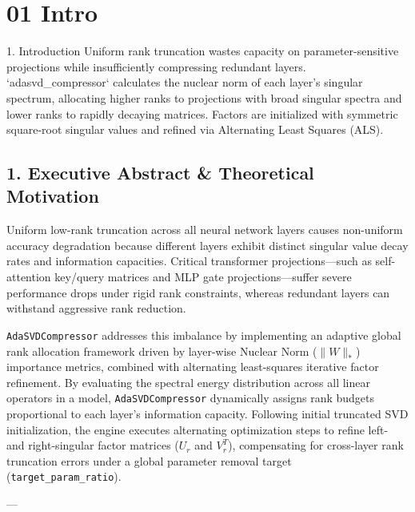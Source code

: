 \section{01 Intro}

 1. Introduction
Uniform rank truncation wastes capacity on parameter-sensitive projections while insufficiently compressing redundant layers. `adasvd\_compressor` calculates the nuclear norm of each layer's singular spectrum, allocating higher ranks to projections with broad singular spectra and lower ranks to rapidly decaying matrices. Factors are initialized with symmetric square-root singular values and refined via Alternating Least Squares (ALS).



\subsection{1. Executive Abstract \& Theoretical Motivation}
Uniform low-rank truncation across all neural network layers causes non-uniform accuracy degradation because different layers exhibit distinct singular value decay rates and information capacities. Critical transformer projections---such as self-attention key/query matrices and MLP gate projections---suffer severe performance drops under rigid rank constraints, whereas redundant layers can withstand aggressive rank reduction.

\texttt{AdaSVDCompressor} addresses this imbalance by implementing an adaptive global rank allocation framework driven by layer-wise Nuclear Norm ($\|W\|_*$) importance metrics, combined with alternating least-squares iterative factor refinement. By evaluating the spectral energy distribution across all linear operators in a model, \texttt{AdaSVDCompressor} dynamically assigns rank budgets proportional to each layer's information capacity. Following initial truncated SVD initialization, the engine executes alternating optimization steps to refine left- and right-singular factor matrices ($U_r$ and $V_r^T$), compensating for cross-layer rank truncation errors under a global parameter removal target (\texttt{target_param_ratio}).

---